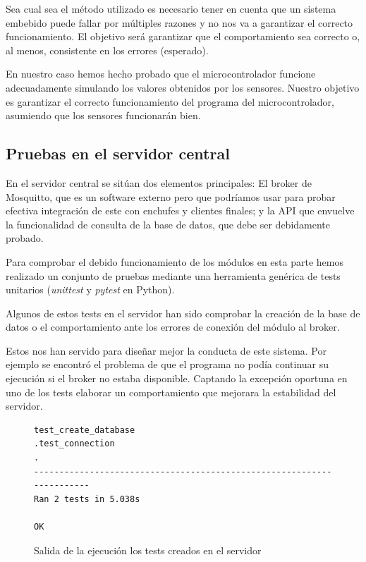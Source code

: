 \documentclass[a4paper,10pt]{article}
\begin{document}
Sea cual sea el método utilizado es necesario tener en cuenta que un
sistema embebido puede fallar por múltiples razones y no nos va a
garantizar el correcto funcionamiento. El objetivo será garantizar que
el comportamiento sea correcto o, al menos, consistente en los errores
(esperado).

En nuestro caso hemos hecho probado que el microcontrolador funcione
adecuadamente simulando los valores obtenidos por los
sensores. Nuestro objetivo es garantizar el correcto funcionamiento
del programa del microcontrolador, asumiendo que los sensores
funcionarán bien.

\newpage

\subsection{Pruebas en el servidor central}

En el servidor central se sitúan dos elementos principales: El broker
de Mosquitto, que es un software externo pero que podríamos usar para
probar efectiva integración de este con enchufes y clientes finales; y
la API que envuelve la funcionalidad de consulta de la base de datos,
que debe ser debidamente probado.

Para comprobar el debido funcionamiento de los módulos en esta parte
hemos realizado un conjunto de pruebas mediante una herramienta
genérica de tests unitarios (\textit{unittest} y \textit{pytest}
en Python).

Algunos de estos tests en el servidor han sido comprobar la creación
de la base de datos o el comportamiento ante los errores de conexión
del módulo al broker.

Estos nos han servido para diseñar mejor la conducta de este
sistema. Por ejemplo se encontró el problema de que el programa no
podía continuar su ejecución si el broker no estaba
disponible. Captando la excepción oportuna en uno de los tests
elaborar un comportamiento que mejorara la estabilidad del servidor.

\begin{figure}[H]
\begin{lstlisting}
test_create_database
.test_connection
.
----------------------------------------------------------------------
Ran 2 tests in 5.038s

OK
\end{lstlisting}

\caption{Salida de la ejecución los tests creados en el servidor}
\end{figure}
\end{document}
